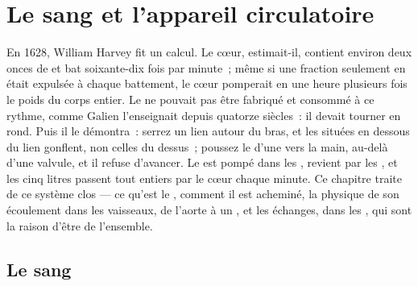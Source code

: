 \chapter{Le sang et l'appareil circulatoire}\label{ch:b2:blood-circulation}

En 1628, William Harvey fit un calcul. Le cœur, estimait-il, contient
environ deux onces de  et bat soixante-dix fois par minute~; même si
une fraction seulement en était expulsée à chaque battement, le cœur
pomperait en une heure plusieurs fois le poids du corps entier. Le 
ne pouvait pas être fabriqué et consommé à ce rythme, comme Galien
l'enseignait depuis quatorze siècles~: il devait tourner en rond. Puis
il le démontra~: serrez un lien autour du bras, et les  situées en
dessous du lien gonflent, non celles du dessus~; poussez le  d'une
 vers la main, au-delà d'une valvule, et il refuse d'avancer. Le
 est pompé dans les , revient par les , et les cinq
litres passent tout entiers par le cœur chaque minute. Ce chapitre
traite de ce système clos --- ce qu'est le , comment il est
acheminé, la physique de son écoulement dans les vaisseaux, de l'aorte
à un , et les échanges, dans les , qui sont la
raison d'être de l'ensemble.

\section{Le sang}

